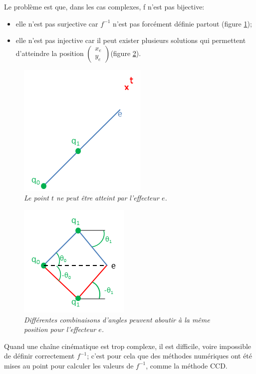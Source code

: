 \documentclass{article}
\begin{document}
 Le probl\`eme est que, dans les cas complexes, f n'est pas bijective:
 \begin{itemize}
 \item elle n'est pas surjective car $f^{-1}$ n'est pas forc\'ement d\'efinie partout (figure \ref{outareach});
 \item elle n'est pas injective car il peut exister plusieurs solutions qui permettent d'atteindre la position
 $\begin{pmatrix} x_e \\ y_e \end{pmatrix}$(figure \ref{multisol}).
 \end{itemize}
 
 
 \begin{figure}[htb]
  \centering
    \includegraphics[]{outareach}
  \caption{
          \textit{Le point $t$ ne peut \^etre atteint par l'effecteur $e$.}}
		   \label{outareach}
\end{figure}
 
 
 \begin{figure}[htb]
  \centering
    \includegraphics[]{multisol}
  \caption{
          \textit{Diff\'erentes combinaisons d'angles peuvent aboutir \`a la m\^eme position pour l'effecteur $e$.}}
		   \label{multisol}
\end{figure}

Quand une cha\^ine cin\'ematique est trop complexe, il est difficile, voire impossible de d\'efinir correctement $f^{-1}$; c'est pour
cela que des m\'ethodes num\'eriques ont \'et\'e mises au point pour calculer les valeurs de $f^{-1}$, comme la m\'ethode CCD.
  
\end{document}
